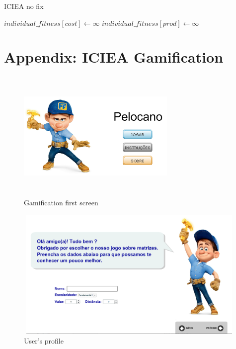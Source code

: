 \documentclass{llncs}
\begin{document}
\FloatBarrier


\begin{algorithm}
\caption{ICIEA no fix}
\label{alg:nofix}
\begin{algorithmic}[1]


	\State $individual\_fitness[cost] \gets  \infty$
	\State $individual\_fitness[prod] \gets  \infty$
\EndFor
\EndProcedure
\end{algorithmic}
\end{algorithm}

\FloatBarrier

\section{Appendix: ICIEA Gamification}

\begin{figure}
\centering
\includegraphics[height=2.5in,width=3in]{pelocano1.png}
\caption{Gamification first screen}
\label{fig:pelocano1}
\end{figure}
\FloatBarrier

\begin{figure}
\centering
\includegraphics[height=2.5in,width=5in]{pelocano2.png}
\caption{User's profile }
\label{fig:pelocano1}
\end{figure}
\FloatBarrier
\end{document}
